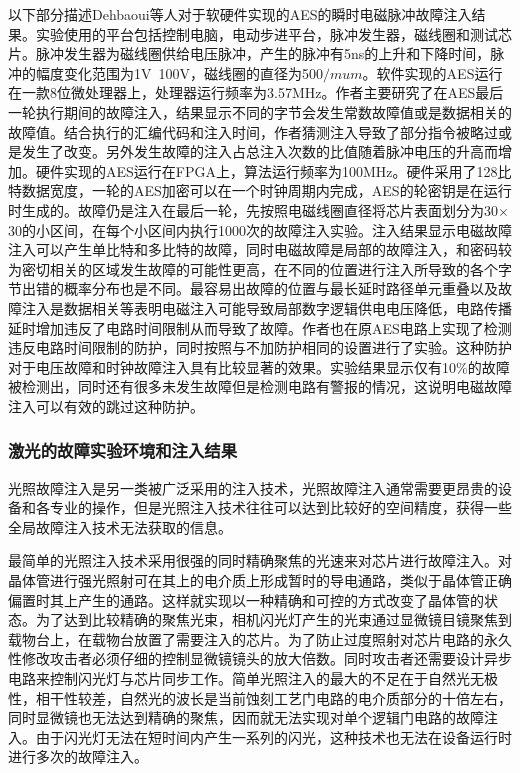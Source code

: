 \documentclass[a4paper,12pt]{article}
\begin{document}
\begin{CJK}{UTF8}{gkai}
以下部分描述Dehbaoui等人对于软硬件实现的AES的瞬时电磁脉冲故障注入结果。实验使用的平台包括控制电脑，电动步进平台，脉冲发生器，磁线圈和测试芯片。脉冲发生器为磁线圈供给电压脉冲，产生的脉冲有5ns的上升和下降时间，脉冲的幅度变化范围为1V~100V，磁线圈的直径为500$/mu m$。软件实现的AES运行在一款8位微处理器上，处理器运行频率为3.57MHz。作者主要研究了在AES最后一轮执行期间的故障注入，结果显示不同的字节会发生常数故障值或是数据相关的故障值。结合执行的汇编代码和注入时间，作者猜测注入导致了部分指令被略过或是发生了改变。另外发生故障的注入占总注入次数的比值随着脉冲电压的升高而增加。硬件实现的AES运行在FPGA上，算法运行频率为100MHz。硬件采用了128比特数据宽度，一轮的AES加密可以在一个时钟周期内完成，AES的轮密钥是在运行时生成的。故障仍是注入在最后一轮，先按照电磁线圈直径将芯片表面划分为30$\times$30的小区间，在每个小区间内执行1000次的故障注入实验。注入结果显示电磁故障注入可以产生单比特和多比特的故障，同时电磁故障是局部的故障注入，和密码较为密切相关的区域发生故障的可能性更高，在不同的位置进行注入所导致的各个字节出错的概率分布也是不同。最容易出故障的位置与最长延时路径单元重叠以及故障注入是数据相关等表明电磁注入可能导致局部数字逻辑供电电压降低，电路传播延时增加违反了电路时间限制从而导致了故障。作者也在原AES电路上实现了检测违反电路时间限制的防护，同时按照与不加防护相同的设置进行了实验。这种防护对于电压故障和时钟故障注入具有比较显著的效果。实验结果显示仅有10\%的故障被检测出，同时还有很多未发生故障但是检测电路有警报的情况，这说明电磁故障注入可以有效的跳过这种防护。

\subsubsection{激光的故障实验环境和注入结果}

光照故障注入是另一类被广泛采用的注入技术，光照故障注入通常需要更昂贵的设备和各专业的操作，但是光照注入技术往往可以达到比较好的空间精度，获得一些全局故障注入技术无法获取的信息。
 
最简单的光照注入技术采用很强的同时精确聚焦的光速来对芯片进行故障注入。对晶体管进行强光照射可在其上的电介质上形成暂时的导电通路，类似于晶体管正确偏置时其上产生的通路。这样就实现以一种精确和可控的方式改变了晶体管的状态。为了达到比较精确的聚焦光束，相机闪光灯产生的光束通过显微镜目镜聚焦到载物台上，在载物台放置了需要注入的芯片。为了防止过度照射对芯片电路的永久性修改攻击者必须仔细的控制显微镜镜头的放大倍数。同时攻击者还需要设计异步电路来控制闪光灯与芯片同步工作。简单光照注入的最大的不足在于自然光无极性，相干性较差，自然光的波长是当前蚀刻工艺门电路的电介质部分的十倍左右，同时显微镜也无法达到精确的聚焦，因而就无法实现对单个逻辑门电路的故障注入。由于闪光灯无法在短时间内产生一系列的闪光，这种技术也无法在设备运行时进行多次的故障注入。


\end{CJK}
\end{document}
